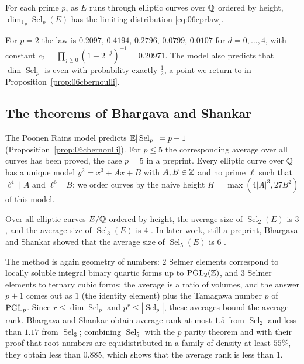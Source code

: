 \begin{conjecture}\label{conj:06cpr}
For each prime $p$, as $E$ runs through elliptic curves over $\mathbb{Q}$ ordered by height, $\dim_{\mathbb{F}_p}\operatorname{Sel}_p(E)$ has the limiting distribution \eqref{eq:06cprlaw}.
\end{conjecture}

For $p = 2$ the law is $0.2097$, $0.4194$, $0.2796$, $0.0799$, $0.0107$ for $d = 0,\dots,4$, with constant $c_2 = \prod_{j\ge0}(1+2^{-j})^{-1} = 0.20971$. The model also predicts that $\dim\operatorname{Sel}_p$ is even with probability exactly $\frac12$, a point we return to in Proposition~\ref{prop:06cbernoulli}.

\subsection{The theorems of Bhargava and Shankar}

The Poonen Rains model predicts $\mathbb{E}|\operatorname{Sel}_p| = p+1$ (Proposition~\ref{prop:06cbernoulli}). For $p\le5$ the corresponding average over all curves has been proved, the case $p = 5$ in a preprint. Every elliptic curve over $\mathbb{Q}$ has a unique model $y^2 = x^3+Ax+B$ with $A,B\in\mathbb{Z}$ and no prime $\ell$ such that $\ell^4\mid A$ and $\ell^6\mid B$; we order curves by the naive height $H = \max(4|A|^3,27B^2)$ of this model.

\begin{theorem}\label{thm:06cbs}
Over all elliptic curves $E/\mathbb{Q}$ ordered by height, the average size of $\operatorname{Sel}_2(E)$ is $3$ \cite{bhargavashankar2015}, and the average size of $\operatorname{Sel}_3(E)$ is $4$ \cite{bhargavashankar2015b}. In later work, still a preprint, Bhargava and Shankar showed that the average size of $\operatorname{Sel}_5(E)$ is $6$ \cite{bhargavashankar2013}.
\end{theorem}

The method is again geometry of numbers: $2$ Selmer elements correspond to locally soluble integral binary quartic forms up to $\mathrm{PGL}_2(\mathbb{Z})$, and $3$ Selmer elements to ternary cubic forms; the average is a ratio of volumes, and the answer $p+1$ comes out as $1$ (the identity element) plus the Tamagawa number $p$ of $\mathrm{PGL}_p$. Since $r\le\dim\operatorname{Sel}_p$ and $p^r\le|\operatorname{Sel}_p|$, these averages bound the average rank. Bhargava and Shankar obtain average rank at most $1.5$ from $\operatorname{Sel}_2$ and less than $1.17$ from $\operatorname{Sel}_3$; combining $\operatorname{Sel}_5$ with the $p$ parity theorem and with their proof that root numbers are equidistributed in a family of density at least $55\%$, they obtain less than $0.885$, which shows that the average rank is less than $1$.

